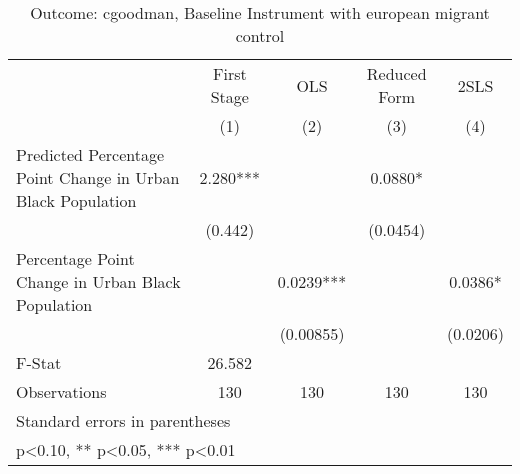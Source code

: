 \begin{table}[htbp]\centering
\def\sym#1{\ifmmode^{#1}\else\(^{#1}\)\fi}
\caption{Outcome: cgoodman, Baseline Instrument with european migrant control}
\begin{tabular}{l*{4}{c}}
\toprule
                    & First Stage   &         OLS   &Reduced Form   &        2SLS   \\
                    &\multicolumn{1}{c}{(1)}   &\multicolumn{1}{c}{(2)}   &\multicolumn{1}{c}{(3)}   &\multicolumn{1}{c}{(4)}   \\
\midrule
Predicted Percentage Point Change in Urban Black Population&       2.280***&               &      0.0880*  &               \\
                    &     (0.442)   &               &    (0.0454)   &               \\
\addlinespace
Percentage Point Change in Urban Black Population&               &      0.0239***&               &      0.0386*  \\
                    &               &   (0.00855)   &               &    (0.0206)   \\
\midrule
F-Stat              &      26.582   &               &               &               \\
Observations        &         130   &         130   &         130   &         130   \\
\bottomrule
\multicolumn{5}{l}{\footnotesize Standard errors in parentheses}\\
\multicolumn{5}{l}{\footnotesize * p<0.10, ** p<0.05, *** p<0.01}\\
\end{tabular}
\end{table}
